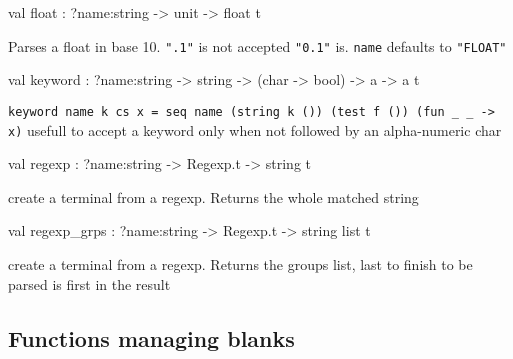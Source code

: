\documentclass[11pt]{article}
\begin{document}
\label{val:Lex.float}\begin{ocamldoccode}
val float : ?name:string -> unit -> float t
\end{ocamldoccode}
\begin{ocamldocdescription}
Parses a float in base 10. {\tt{".1"}} is not accepted {\tt{"0.1"}} is.
    {\tt{name}} defaults to {\tt{"FLOAT"}}


\end{ocamldocdescription}




\label{val:Lex.keyword}\begin{ocamldoccode}
val keyword : ?name:string -> string -> (char -> bool) -> {\textquotesingle}a -> {\textquotesingle}a t
\end{ocamldoccode}
\begin{ocamldocdescription}
{\tt{keyword {}name k cs x =\
     seq {}name (string k ()) (test f ()) (fun \_ \_ -> x)}}
    usefull to accept a keyword only when not followed by an alpha-numeric char


\end{ocamldocdescription}




\label{val:Lex.regexp}\begin{ocamldoccode}
val regexp : ?name:string -> Regexp.t -> string t
\end{ocamldoccode}
\begin{ocamldocdescription}
create a terminal from a regexp. Returns the whole matched string


\end{ocamldocdescription}




\label{val:Lex.regexp-underscoregrps}\begin{ocamldoccode}
val regexp_grps : ?name:string -> Regexp.t -> string list t
\end{ocamldoccode}
\begin{ocamldocdescription}
create a terminal from a regexp. Returns the groups list, last to finish
    to be parsed is first in the result


\end{ocamldocdescription}




\subsection{Functions managing blanks}
\end{document}
